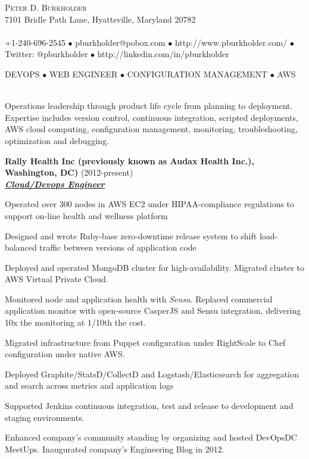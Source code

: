 \documentclass{article}
\newcommand{\lineunder}{\vspace*{-8pt} \\ \hspace*{-18pt} \hrulefill \\}
\newcommand{\header}[1]{{\hspace*{-15pt}\vspace*{6pt} \textsc{#1}} \vspace*{-6pt} \lineunder}
\newcommand{\centeredheader}[1]{
  \vspace*{6pt} 
  \begin{center}
    \textsc{#1}
    \lineunder
  \end{center}
}
\newcommand{\employer}[3]{{ \textbf{#1} (#2)\\ \underline{\textbf{\emph{#3}}}\\ \nopagebreak }}
\newcommand{\contact}[3]{
    \vspace*{-8pt}
    \begin{center}
        {\LARGE \scshape {#1}}\\
        #2 \lineunder 
        #3
    \end{center}
    \vspace*{-8pt}
}
\newenvironment{achievements}{\begin{list}{\topsep 0pt \itemsep -2pt}} {\vspace*{4pt}\end{list}}
\begin{document}
\smallskip
\vspace*{-44pt}

\contact{Peter D. Burkholder}
{7101 Bridle Path Lane, Hyattsville, Maryland 20782}
{+1-240-696-2545 $\bullet$ pburkholder@pobox.com  $\bullet$ http://www.pburkholder.com/ $\bullet$ Twitter: @pburkholder $\bullet$ http://linkedin.com/in/pburkholder }

\centeredheader{DEVOPS $\bullet$ WEB ENGINEER $\bullet$ CONFIGURATION MANAGEMENT $\bullet$ AWS}
\begin{achievements}
   \item Operations leadership through product life cycle from planning to deployment. Expertise includes version control, continuous integration, scripted deployments, AWS cloud computing, configuration management, monitoring, troubleshooting, optimization and debugging.
\end{achievements}

\smallskip

\employer{Rally Health Inc (previously known as Audax Health Inc.), Washington, DC)}{2012-present}{Cloud/Devops Engineer}
\begin{achievements}
  \item Operated over 300 nodes in AWS EC2 under HIPAA-compliance regulations to support on-line health and wellness platform
  \item Designed and wrote Ruby-base zero-downtime release system to shift load-balanced traffic between versions of application code
  \item Deployed and operated MongoDB cluster for high-availability. Migrated cluster to AWS Virtual Private Cloud.
  \item Monitored node and application health with \emph{Sensu}. Replaced commercial application monitor with open-source CasperJS and Sensu integration, delivering 10x the monitoring at 1/10th the cost.
  \item Migrated infrastructure from Puppet configuration under RightScale to Chef configuration under native AWS.
  \item Deployed Graphite/StatsD/CollectD and Logstash/Elasticsearch for aggregation and search across metrics and application logs
  \item Supported Jenkins continuous integration, test and release to development and staging environments.
  \item Enhanced company's community standing by organizing and hosted DevOpsDC MeetUps. Inaugurated company's Engineering Blog in 2012.
\end{achievements}
\end{document}
